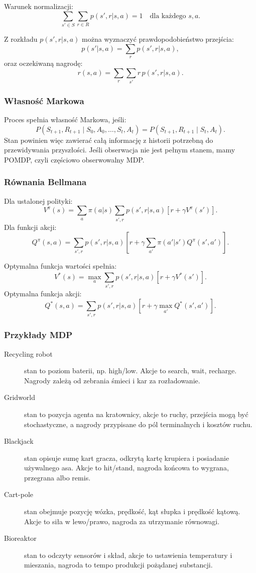Warunek normalizacji:
\[
\sum_{s'\in S}\sum_{r\in R}p(s',r|s,a)=1
\quad\text{dla każdego }s,a.
\]

Z rozkładu $p(s',r|s,a)$ można wyznaczyć prawdopodobieństwo przejścia:
\[
p(s'|s,a)=\sum_r p(s',r|s,a),
\]
oraz oczekiwaną nagrodę:
\[
r(s,a)=\sum_r\sum_{s'} r\,p(s',r|s,a).
\]

\subsubsection{Własność Markowa}

Proces spełnia własność Markowa, jeśli:
\[
P(S_{t+1},R_{t+1}\mid S_0,A_0,\dots,S_t,A_t)
=P(S_{t+1},R_{t+1}\mid S_t,A_t).
\]
Stan powinien więc zawierać całą informację z historii potrzebną do przewidywania przyszłości. Jeśli obserwacja nie jest pełnym stanem, mamy POMDP, czyli częściowo obserwowalny MDP.

\subsubsection{Równania Bellmana}

Dla ustalonej polityki:
\[
V^\pi(s)=\sum_a\pi(a|s)\sum_{s',r}p(s',r|s,a)\left[r+\gamma V^\pi(s')\right].
\]
Dla funkcji akcji:
\[
Q^\pi(s,a)=\sum_{s',r}p(s',r|s,a)\left[r+\gamma\sum_{a'}\pi(a'|s')Q^\pi(s',a')\right].
\]

Optymalna funkcja wartości spełnia:
\[
V^*(s)=\max_a\sum_{s',r}p(s',r|s,a)\left[r+\gamma V^*(s')\right].
\]
Optymalna funkcja akcji:
\[
Q^*(s,a)=\sum_{s',r}p(s',r|s,a)\left[r+\gamma\max_{a'}Q^*(s',a')\right].
\]

\subsubsection{Przykłady MDP}

\begin{description}
  \item[Recycling robot] stan to poziom baterii, np. high/low. Akcje to search, wait, recharge. Nagrody zależą od zebrania śmieci i kar za rozładowanie.
  \item[Gridworld] stan to pozycja agenta na kratownicy, akcje to ruchy, przejścia mogą być stochastyczne, a nagrody przypisane do pól terminalnych i kosztów ruchu.
  \item[Blackjack] stan opisuje sumę kart gracza, odkrytą kartę krupiera i posiadanie używalnego asa. Akcje to hit/stand, nagroda końcowa to wygrana, przegrana albo remis.
  \item[Cart-pole] stan obejmuje pozycję wózka, prędkość, kąt słupka i prędkość kątową. Akcje to siła w lewo/prawo, nagroda za utrzymanie równowagi.
  \item[Bioreaktor] stan to odczyty sensorów i skład, akcje to ustawienia temperatury i mieszania, nagroda to tempo produkcji pożądanej substancji.
\end{description}

